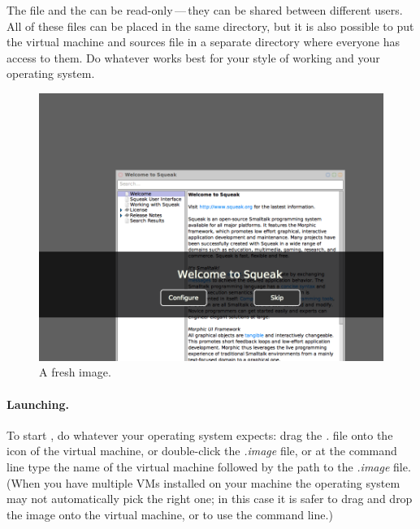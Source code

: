 \documentclass[a4paper,10pt,twoside]{book}
\begin{document}
The  file and the  can be read-only\,---\,they can be shared between different users.
All of these files can be placed in the same directory, but it is also possible to put the virtual machine and sources file in a separate directory where everyone has access to them.
Do whatever works best for your style of working and your operating system.


\begin{figure}[htb]
\centerline {\includegraphics[width=\textwidth]{startup}}
\caption{A fresh \sbe image.\label{fig:startup}}
\end{figure}

\paragraph{Launching.} To start \sq, do whatever your operating system expects: drag the \emph{.} file onto the icon of the virtual machine, or double-click the \emph{.image} file, or  at the command line type the name of the virtual machine followed by the path to the \emph{.image} file. (When you have multiple VMs installed on your machine the operating system may not automatically pick the right one; in this case it is safer to drag and drop the image onto the virtual machine, or to use the command line.)
\end{document}
